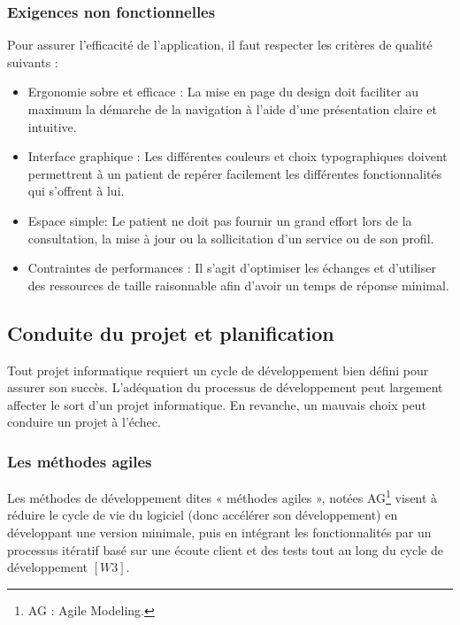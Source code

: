 \subsubsection{Exigences non fonctionnelles}

Pour assurer l’efficacité de l'application, il faut respecter les critères de qualité suivants :

\vspace{6pt}
\paragraphmark

\begin{itemize}
	\item Ergonomie sobre et efficace : La mise en page du design doit faciliter au maximum la démarche de la navigation à l’aide d’une présentation claire et intuitive.
	\item Interface graphique : Les différentes couleurs et choix typographiques doivent permettrent à un patient de repérer facilement les différentes fonctionnalités qui s’offrent à lui.
	\item Espace simple: Le patient ne doit pas fournir un grand effort lors de la consultation, la mise à jour ou la sollicitation d’un service ou de son profil.
	\item Contraintes de performances : Il s’agit d’optimiser les échanges et d’utiliser des ressources de taille raisonnable afin d’avoir un temps de réponse minimal.
\end{itemize}

\subsection{Conduite du projet et planification}

Tout projet informatique requiert un cycle de développement bien défini pour assurer son succès. L’adéquation du processus de développement peut largement affecter le sort d’un projet informatique. En revanche, un mauvais choix peut conduire un projet à l’échec.

\subsubsection{Les méthodes agiles}

Les méthodes de développement dites « méthodes agiles », notées AG\footnote{AG : Agile Modeling.} visent à réduire le cycle de vie du logiciel (donc accélérer son développement) en développant une version minimale, puis en intégrant les fonctionnalités par un processus itératif basé sur une écoute
client et des tests tout au long du cycle de développement $[W3]$.

